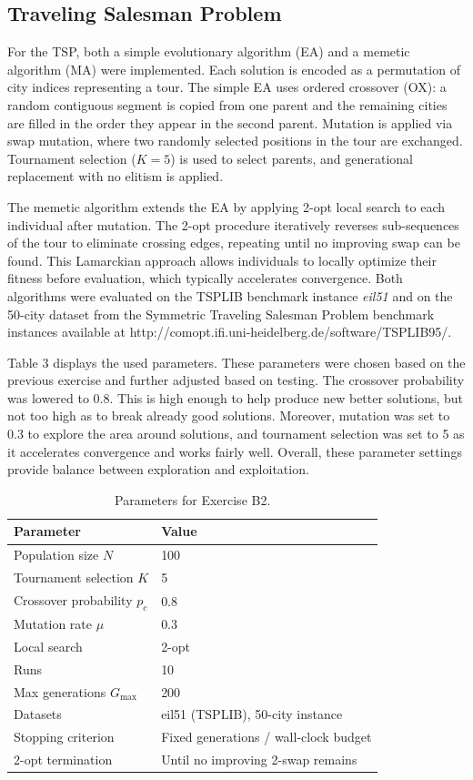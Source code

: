 \documentclass{article}
\begin{document}
\subsection*{Traveling Salesman Problem}
For the TSP, both a simple evolutionary algorithm (EA) and a memetic algorithm (MA) were implemented. Each solution is encoded as a permutation of city indices representing a tour. The simple EA uses ordered crossover (OX): a random contiguous segment is copied from one parent and the remaining cities are filled in the order they appear in the second parent. Mutation is applied via swap mutation, where two randomly selected positions in the tour are exchanged. Tournament selection ($K = 5$) is used to select parents, and generational replacement with no elitism is applied.

The memetic algorithm extends the EA by applying 2-opt local search to each individual after mutation. The 2-opt procedure iteratively reverses sub-sequences of the tour to eliminate crossing edges, repeating until no improving swap can be found. This Lamarckian approach allows individuals to locally optimize their fitness before evaluation, which typically accelerates convergence. Both algorithms were evaluated on the TSPLIB benchmark instance \textit{eil51} and on the 50-city dataset from the Symmetric Traveling Salesman Problem benchmark instances available at http://comopt.ifi.uni-heidelberg.de/software/TSPLIB95/.

Table 3 displays the used parameters. These parameters were chosen based on the previous exercise and further adjusted based on testing. The crossover probability was lowered to 0.8. This is high enough to help produce new better solutions, but not too high as to break already good solutions. Moreover, mutation was set to 0.3 to explore the area around solutions, and tournament selection was set to 5 as it accelerates convergence and works fairly well. Overall, these parameter settings provide balance between exploration and exploitation.

\begin{table}[H]
\centering
\begin{tabular}{ll}
\hline
\textbf{Parameter} & \textbf{Value} \\
\hline
Population size $N$ & 100 \\
Tournament selection $K$ & 5 \\
Crossover probability $p_c$ & 0.8 \\
Mutation rate $\mu$ & 0.3 \\
Local search & 2-opt \\
Runs & 10 \\
Max generations $G_{\max}$ & 200 \\
Datasets & eil51 (TSPLIB), 50-city instance\\
Stopping criterion & Fixed generations / wall-clock budget \\
2-opt termination & Until no improving 2-swap remains \\
\hline
\end{tabular}
\caption{Parameters for Exercise B2.}
\end{table}
\end{document}
